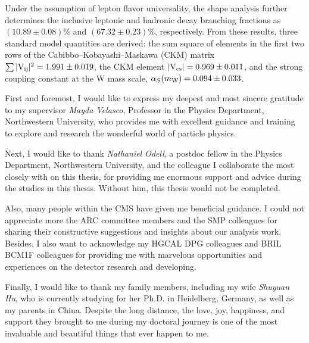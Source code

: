 \documentclass[12pt,reqno]{nuthesis}
\begin{document}
    Under the assumption of lepton flavor universality, the shape analysis further determines the inclusive leptonic and hadronic decay branching fractions as $(10.89 \pm 0.08)\%$ and $(67.32 \pm 0.23)\%$, respectively. From these results, three standard model quantities are derived: the sum square of elements in the first two rows of the Cabibbo--Kobayashi--Maskawa (CKM) matrix  $\sum{\ensuremath{\lvert \mathrm{V_{ij}} \rvert}^{2}} = 1.991 \pm 0.019$, the CKM element $\lvert \mathrm{V_{cs}} \rvert = 0.969 \pm 0.011$, and the strong coupling constant at the W mass scale, $\alpha_S(m_\mathrm{W}) = 0.094 \pm 0.033$.


    \acknowledgements

    First and foremost, I would like to express my deepest and most sincere gratitude to my supervisor \textit{Mayda Velasco}, Professor in the Physics Department, Northwestern University, who provides me with excellent guidance and training to explore and research the wonderful world of particle physics. 

    Next, I would like to thank \textit{Nathaniel Odell}, a postdoc fellow in the Physics Department, Northwestern University, and the colleague I collaborate the most closely with on this thesis, for providing me enormous support and advice during the studies in this thesis. Without him, this thesis would not be completed. 

    Also, many people within the CMS have given me beneficial guidance. I could not appreciate more the ARC committee members and the SMP colleagues for sharing their constructive suggestions and insights about our analysis work. Besides, I also want to acknowledge my HGCAL DPG colleagues and BRIL BCM1F colleagues for providing me with marvelous opportunities and experiences on the detector research and developing.

    Finally, I would like to thank my family members, including my wife \textit{Shuyuan Hu}, who is currently studying for her Ph.D. in Heidelberg, Germany, as well as my parents in China. Despite the long distance, the love, joy, happiness, and support they brought to me during my doctoral journey is one of the most invaluable and beautiful things that ever happen to me.



    \clearpage{} 
    \setcounter{tocdepth}{2}
        \tableofcontents	
\end{document}
